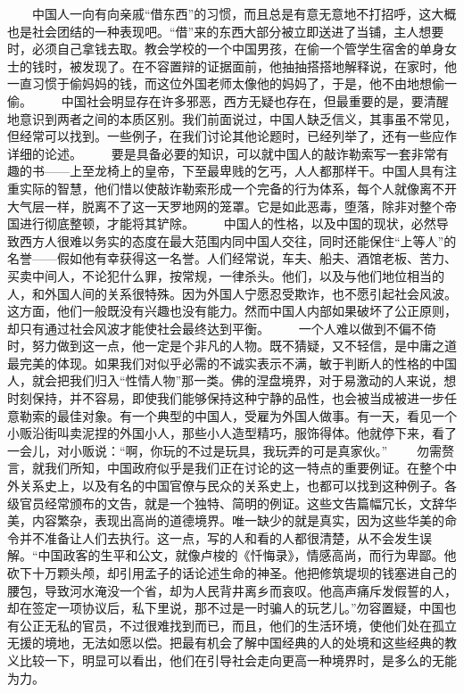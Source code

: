 \documentclass[12pt,oneside]{book}
\begin{document}
\begin{common-format}
　　中国人一向有向亲戚“借东西”的习惯，而且总是有意无意地不打招呼，这大概也是社会团结的一种表现吧。“借”来的东西大部分被立即送进了当铺，主人想要时，必须自己拿钱去取。教会学校的一个中国男孩，在偷一个管学生宿舍的单身女士的钱时，被发现了。在不容置辩的证据面前，他抽抽搭搭地解释说，在家时，他一直习惯于偷妈妈的钱，而这位外国老师太像他的妈妈了，于是，他不由地想偷一偷。 
　　中国社会明显存在许多邪恶，西方无疑也存在，但最重要的是，要清醒地意识到两者之间的本质区别。我们前面说过，中国人缺乏信义，其事虽不常见，但经常可以找到。一些例子，在我们讨论其他论题时，已经列举了，还有一些应作详细的论述。 
　　要是具备必要的知识，可以就中国人的敲诈勒索写一套非常有趣的书——上至龙椅上的皇帝，下至最卑贱的乞丐，人人都那样干。中国人具有注重实际的智慧，他们惜以使敲诈勒索形成一个完备的行为体系，每个人就像离不开大气层一样，脱离不了这一天罗地网的笼罩。它是如此恶毒，堕落，除非对整个帝国进行彻底整顿，才能将其铲除。 
　　中国人的性格，以及中国的现状，必然导致西方人很难以务实的态度在最大范围内同中国人交往，同时还能保住“上等人”的名誉——假如他有幸获得这一名誉。人们经常说，车夫、船夫、酒馆老板、苦力、买卖中间人，不论犯什么罪，按常规，一律杀头。他们，以及与他们地位相当的人，和外国人间的关系很特殊。因为外国人宁愿忍受欺诈，也不愿引起社会风波。这方面，他们一般既没有兴趣也没有能力。然而中国人内部如果破坏了公正原则，却只有通过社会风波才能使社会最终达到平衡。 
　　一个人难以做到不偏不倚时，努力做到这一点，他一定是个非凡的人物。既不猜疑，又不轻信，是中庸之道最完美的体现。如果我们对似乎必需的不诚实表示不满，敏于判断人的性格的中国人，就会把我们归入“性情人物”那一类。佛的涅盘境界，对于易激动的人来说，想时刻保持，并不容易，即使我们能够保持这种宁静的品性，也会被当成被进一步任意勒索的最佳对象。有一个典型的中国人，受雇为外国人做事。有一天，看见一个小贩沿街叫卖泥捏的外国小人，那些小人造型精巧，服饰得体。他就停下来，看了一会儿，对小贩说：“啊，你玩的不过是玩具，我玩弄的可是真家伙。” 
　　勿需赘言，就我们所知，中国政府似乎是我们正在讨论的这一特点的重要例证。在整个中外关系史上，以及有名的中国官僚与民众的关系史上，也都可以找到这种例子。各级官员经常颁布的文告，就是一个独特、简明的例证。这些文告篇幅冗长，文辞华美，内容繁杂，表现出高尚的道德境界。唯一缺少的就是真实，因为这些华美的命令并不准备让人们去执行。这一点，写的人和看的人都很清楚，从不会发生误解。“中国政客的生平和公文，就像卢梭的《忏悔录》，情感高尚，而行为卑鄙。他砍下十万颗头颅，却引用孟子的话论述生命的神圣。他把修筑堤坝的钱塞进自己的腰包，导致河水淹没一个省，却为人民背井离乡而哀叹。他高声痛斥发假誓的人，却在签定一项协议后，私下里说，那不过是一时骗人的玩艺儿。”勿容置疑，中国也有公正无私的官员，不过很难找到而已，而且，他们的生活环境，使他们处在孤立无援的境地，无法如愿以偿。把最有机会了解中国经典的人的处境和这些经典的教义比较一下，明显可以看出，他们在引导社会走向更高一种境界时，是多么的无能为力。 

\end{common-format}
\end{document}
